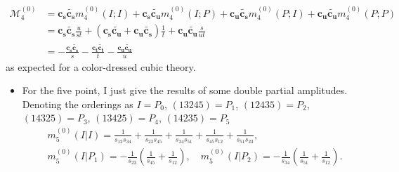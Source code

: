 \documentclass{beamer}
\begin{document}
\begin{frame}
    \begin{align*}
        \!\!\!\!\mathcal{M}_4^{(0)}&=\mathbf{c_s}\tilde{\mathbf{c_s}}m_4^{(0)}(I;I)+\mathbf{c_s}\tilde{\mathbf{c_u}}m_4^{(0)}(I;P)+\mathbf{c_u}\tilde{\mathbf{c_s}}m_4^{(0)}(P;I)+\mathbf{c_u}\tilde{\mathbf{c_u}}m_4^{(0)}(P;P)\\
        &=\mathbf{c_s}\tilde{\mathbf{c_s}}\frac{u}{st}+(\mathbf{c_s}\tilde{\mathbf{c_u}}+\mathbf{c_u}\tilde{\mathbf{c_s}})\frac{1}{t}+\mathbf{c_u}\tilde{\mathbf{c_u}}\frac{s}{ut}\\
        &=-\frac{\mathbf{c_s}\tilde{\mathbf{c_s}}}{s}-\frac{\mathbf{c_t}\tilde{\mathbf{c_t}}}{t}-\frac{\mathbf{c_u}\tilde{\mathbf{c_u}}}{u}
    \end{align*}
    \quad \quad as expected for a color-dressed cubic theory.
    \begin{itemize}
        \item For the five point, I just give the results of some double partial amplitudes.
        Denoting the orderings as $I=P_0$, $(13245)=P_1$, $(12435)=P_2$, $(14325)=P_3$, $(13425)=P_4$, $(14235)=P_5$
        \begin{equation*}
            \begin{aligned}&m_5^{(0)}(I|I)=\frac{1}{s_{12}s_{34}}+\frac{1}{s_{23}s_{45}}+\frac{1}{s_{34}s_{51}}+\frac{1}{s_{45}s_{12}}+\frac{1}{s_{51}s_{23}},\\&m_5^{(0)}(I|P_1)=-\frac{1}{s_{23}}\left(\frac{1}{s_{45}}+\frac{1}{s_{12}}\right),\quad
                m_5^{(0)}(I|P_2)=-\frac{1}{s_{34}}\left(\frac{1}{s_{51}}+\frac{1}{s_{12}}\right).\end{aligned}
        \end{equation*}
    \end{itemize}
\end{frame}
\end{document}
